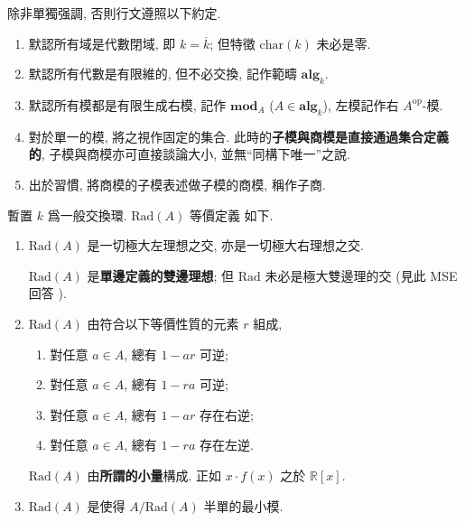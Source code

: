 \begin{notation}\label{NotofArtinAlg}
    除非單獨强調, 否則行文遵照以下約定. 
    \begin{enumerate}
        \item 默認所有域是代數閉域, 即 $k = \overline k$; 但特徵 $\mathrm{char}(k)$ 未必是零. 
        \item 默認所有代數是有限維的, 但不必交換, 記作範疇 $𝐚𝐥𝐠_k$. 
        \item 默認所有模都是有限生成右模, 記作 $𝐦𝐨𝐝_A$ ($A ∈ 𝐚𝐥𝐠_k$), 左模記作右 $A^{\mathrm{op}}$-模. 
        \item 對於單一的模, 將之視作固定的集合. 此時的\textbf{子模與商模是直接通過集合定義的}, 子模與商模亦可直接談論大小, 並無``同構下唯一''之說. 
        \item 出於習慣, 將商模的子模表述做子模的商模, 稱作子商.
    \end{enumerate}
\end{notation}

\begin{definition}[Jacobson 根]\label{Rad} 
    暫置 $k$ 爲一般交換環. $\mathrm{Rad}(A)$ 等價定義 如下. 
\begin{enumerate}
    \item $\mathrm{Rad}(A)$ 是一切極大左理想之交, 亦是一切極大右理想之交. 
    \begin{pinked}
        $\mathrm{Rad}(A)$ 是\textbf{單邊定義的雙邊理想}; 但 $\mathrm{Rad}$ 未必是極大雙邊理的交 (見此 MSE 回答 \cite{775}).
    \end{pinked}
    \item $\mathrm{Rad}(A)$ 由符合以下等價性質的元素 $r$ 組成, 
    \begin{enumerate}
        \item 對任意 $a ∈ A$, 總有 $1-ar$ 可逆;
        \item 對任意 $a ∈ A$, 總有 $1-ra$ 可逆;
        \item 對任意 $a ∈ A$, 總有 $1-ar$ 存在右逆;
        \item 對任意 $a ∈ A$, 總有 $1-ra$ 存在左逆.
    \end{enumerate}
    \begin{pinked}
        $\mathrm{Rad}(A)$ 由\textbf{所謂的小量}構成. 正如 $x⋅f(x)$ 之於 $ℝ[x]$.
    \end{pinked}
    \item $\mathrm{Rad}(A)$ 是使得 $A / \mathrm{Rad}(A)$ 半單的最小模. 
\end{enumerate}

\end{definition}

